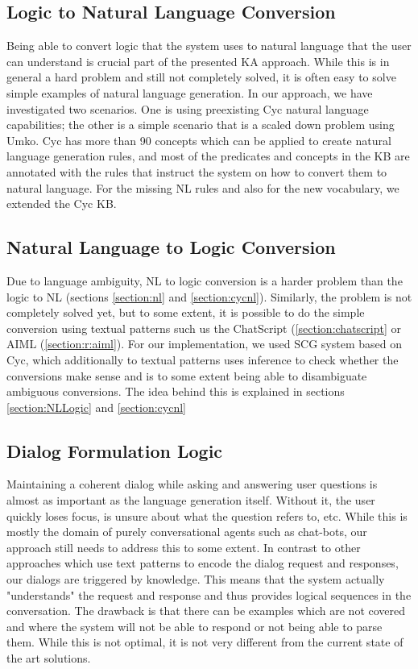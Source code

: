 \subsection{Logic to Natural Language Conversion}
Being able to convert logic that the system uses to natural language that the 
user can understand is crucial part of the presented KA approach. While this is 
in general a hard problem and still not completely solved, it is often easy to 
solve simple examples of natural language generation. In our approach, we have 
investigated two scenarios. One is using preexisting Cyc natural language 
capabilities; the other is a simple scenario that is a scaled down problem 
using Umko. Cyc has more than 90 concepts which can be applied to create 
natural language generation rules\parencite{Baxter2005}, and most of the 
predicates and concepts in the KB are annotated with the rules that instruct 
the system on how to convert them to natural language. For the missing NL 
rules and also for the new vocabulary, we extended the Cyc KB.

\subsection{Natural Language to Logic Conversion}
\label{section:bg:nlToLogic}
Due to language ambiguity, 
NL to logic conversion is a harder problem than the logic to NL
\parencite{Schneider2015} (sections \ref{section:nl} and \ref{section:cycnl}). 
Similarly, the problem is not completely solved yet, but to some extent, it is 
possible to do the simple conversion using textual patterns such us the 
ChatScript (\autoref{section:chatscript} or AIML (\autoref{section:r:aiml}). 
For our implementation, we used SCG system based on Cyc, which additionally to 
textual patterns uses 
inference to check whether the conversions make sense and is to some extent 
being able to disambiguate ambiguous conversions\parencite{Schneider2015}.
The idea behind this is explained in sections \ref{section:NLLogic} and
\ref{section:cycnl}

\subsection{Dialog Formulation Logic}
Maintaining a coherent dialog while asking and answering user questions is 
almost as important as the language generation itself. Without it, the user 
quickly loses focus, is unsure about what the question refers to, etc. 
While this is mostly the domain of purely conversational agents such as 
chat-bots\parencite{Bradesko2012}, our approach still needs to address this to 
some extent. In contrast to other approaches which use text patterns to encode 
the dialog request and responses, our dialogs are triggered by knowledge. 
This means that the system actually "understands" the request and response and 
thus provides logical sequences in the conversation. The drawback is that there
can be examples which are not covered and where the system will not be able to
respond or not being able to parse them. While this is not optimal, it is not 
very different from the current state of the art solutions.

